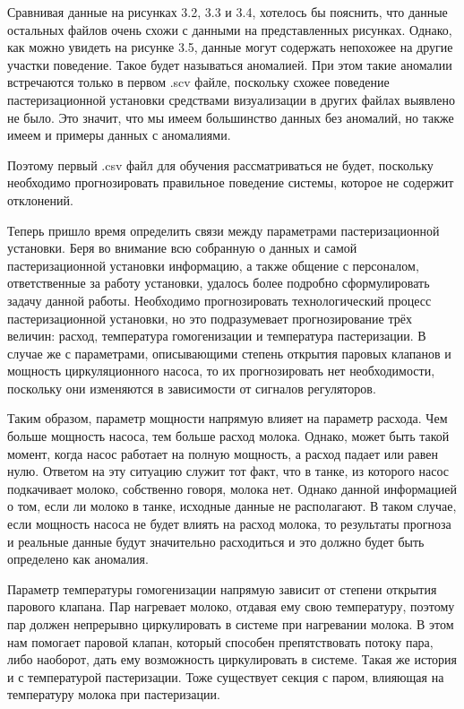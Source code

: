 {  \par \redline Сравнивая данные на рисунках 3.2, 3.3 и 3.4, хотелось бы пояснить, что данные остальных файлов очень схожи с данными на представленных рисунках. Однако, как можно увидеть на рисунке 3.5, данные могут содержать непохожее на другие участки поведение. Такое будет называться аномалией. При этом такие аномалии встречаются только в первом .scv файле, поскольку схожее поведение пастеризационной установки средствами визуализации в других файлах выявлено не было. Это значит, что мы имеем большинство данных без аномалий, но также имеем и примеры данных с аномалиями. 

  \par \redline Поэтому первый .csv файл для обучения рассматриваться не будет, поскольку необходимо прогнозировать правильное поведение системы, которое не содержит отклонений. 

  \par \redline Теперь пришло время определить связи между параметрами пастеризационной установки. Беря во внимание всю собранную о данных и самой пастеризационной установки информацию, а также общение с персоналом, ответственные за работу установки, удалось более подробно сформулировать задачу данной работы. Необходимо прогнозировать технологический процесс пастеризационной установки, но это подразумевает прогнозирование трёх величин: расход, температура гомогенизации и температура пастеризации. В случае же с параметрами, описывающими степень открытия паровых клапанов и мощность циркуляционного насоса, то их прогнозировать нет необходимости, поскольку они изменяются в зависимости от сигналов регуляторов. 

  \par \redline Таким образом, параметр мощности напрямую влияет на параметр расхода. Чем больше мощность насоса, тем больше расход молока. Однако, может быть такой момент, когда насос работает на полную мощность, а расход падает или равен нулю. Ответом на эту ситуацию служит тот факт, что в танке, из которого насос подкачивает молоко, собственно говоря, молока нет. Однако данной информацией о том, если ли молоко в танке, исходные данные не располагают. В таком случае, если мощность насоса не будет влиять на расход молока, то результаты прогноза и реальные данные будут значительно расходиться и это должно будет быть определено как аномалия. 
  
  \par \redline Параметр температуры гомогенизации напрямую зависит от степени открытия парового клапана. Пар нагревает молоко, отдавая ему свою температуру, поэтому пар должен непрерывно циркулировать в системе при нагревании молока. В этом нам помогает паровой клапан, который способен препятствовать потоку пара, либо наоборот, дать ему возможность циркулировать в системе. Такая же история и с температурой пастеризации. Тоже существует секция с паром, влияющая на температуру молока при пастеризации. 
  
}
